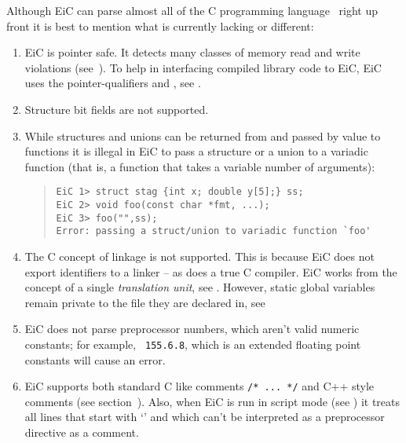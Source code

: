 Although EiC can parse almost all of the  C programming
language~\cite{kernighan-ritchie88} right up front it is
best to mention what is currently lacking or different:
\begin{enumerate}

\item EiC is pointer safe. It detects many classes
of memory read and write violations
(see~). To help in interfacing
compiled library code to EiC, EiC uses the pointer-qualifiers
 and , see .


\item Structure  bit fields 
 are not supported.

\item 

While structures and unions can be returned from and passed by value to
functions it is illegal in EiC to pass a structure
or a union to a variadic function (that is, a function that
takes a variable number of arguments):
        \begin{quote}
        \begin{verbatim}
EiC 1> struct stag {int x; double y[5];} ss; 
EiC 2> void foo(const char *fmt, ...);  
EiC 3> foo("",ss);
Error: passing a struct/union to variadic function `foo'
        \end{verbatim}
        \end{quote}

\item The C concept of linkage is not supported.
        This is because EiC does not export identifiers to a linker --
        as does a true C compiler. EiC works from the concept of a
        single {\it translation unit}, see
        . However, static global variables
        remain private to the file they are declared in, see


\item EiC does not parse preprocessor numbers, 
        which aren't valid numeric constants; for example, {\tt
155.6.8}, which is an extended floating point constants will cause an
error.

\item EiC supports both standard C like comments \verb+/* ... */+
        and C++ style comments (see section~). Also, when
	EiC is run in script mode (see ) it
	treats all lines that start with `\T{\#}' and which can't be
	interpreted as a preprocessor directive as a comment.


\end{enumerate}
